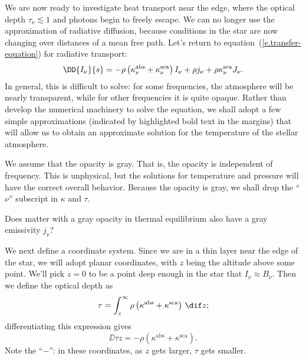 
We are now ready to investigate heat transport near the edge, where the optical depth $\tau_{\nu} \lesssim 1$ and photons begin to freely escape. We can no longer use the approximation of radiative diffusion, because conditions in the star are now changing over distances of a mean free path. Let's return to equation~(\ref{e.transfer-equation}) for radiative transport:
\[
	\DD{I_{\nu}}{s} = -\rho\left(\kapabs + \kapscat\right) I_{\nu} + \rho j_{\nu} + \rho\kapscat J_{\nu}.
\]
In general, this is difficult to solve: for some frequencies, the atmosphere will be nearly transparent, while for other frequencies it is quite opaque. Rather than develop the numerical machinery to solve the equation, we shall adopt a few simple approximations (indicated by highlighted bold text in the margins) that will allow us to obtain an approximate solution for the temperature of the stellar atmosphere.

We assume that the opacity is gray. That is, the opacity is independent of frequency. This is unphysical, but the solutions for temperature and pressure will have the correct overall behavior. Because the opacity is gray, we shall drop the ``$\nu$'' subscript in $\kappa$ and $\tau$.

\begin{exercisebox}
Does matter with a gray opacity in thermal equilibrium also have a gray emissivity $j_{\nu}$?
\end{exercisebox}

We next define a coordinate system. Since we are in a thin layer near the edge of the star, we will adopt planar coordinates, with $z$ being the altitude above some point. We'll pick $z=0$ to be a point deep enough in the star that $I_{\nu}\approx B_{\nu}$. Then we define the optical depth as
\begin{equation}\label{e.optical-depth-planar}
	\tau = \int_{z}^{\infty} \rho\left(\kappa^{\mathrm{abs}}+\kappa^{\mathrm{sca}}\right)\,\dif z ;
\end{equation}
differentiating this expression gives
\[
	\DD{\tau}{z} = -\rho\left(\kappa^{\mathrm{abs}}+\kappa^{\mathrm{sca}}\right).
\]
Note the ``$-$'': in these coordinates, as $z$ gets larger, $\tau$ gets smaller.

